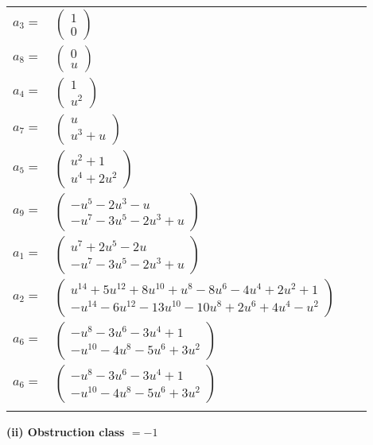 \documentclass[1p]{elsarticle_modified}
\theoremstyle{definition}
\begin{document}
\begin{tabular}{m{7pt} m{180pt} m{7pt} m{180pt} }
\flushright $a_{3}=$&$\begin{pmatrix}1\\0\end{pmatrix}$ \\
\flushright $a_{8}=$&$\begin{pmatrix}0\\u\end{pmatrix}$ \\
\flushright $a_{4}=$&$\begin{pmatrix}1\\u^2\end{pmatrix}$ \\
\flushright $a_{7}=$&$\begin{pmatrix}u\\u^3+u\end{pmatrix}$ \\
\flushright $a_{5}=$&$\begin{pmatrix}u^2+1\\u^4+2 u^2\end{pmatrix}$ \\
\flushright $a_{9}=$&$\begin{pmatrix}- u^5-2 u^3- u\\- u^7-3 u^5-2 u^3+u\end{pmatrix}$ \\
\flushright $a_{1}=$&$\begin{pmatrix}u^7+2 u^5-2 u\\- u^7-3 u^5-2 u^3+u\end{pmatrix}$ \\
\flushright $a_{2}=$&$\begin{pmatrix}u^{14}+5 u^{12}+8 u^{10}+u^8-8 u^6-4 u^4+2 u^2+1\\- u^{14}-6 u^{12}-13 u^{10}-10 u^8+2 u^6+4 u^4- u^2\end{pmatrix}$ \\
\flushright $a_{6}=$&$\begin{pmatrix}- u^8-3 u^6-3 u^4+1\\- u^{10}-4 u^8-5 u^6+3 u^2\end{pmatrix}$\\ \flushright $a_{6}=$&$\begin{pmatrix}- u^8-3 u^6-3 u^4+1\\- u^{10}-4 u^8-5 u^6+3 u^2\end{pmatrix}$\\&\end{tabular}
\flushleft \textbf{(ii) Obstruction class $= -1$}\\~\\
\end{document}
